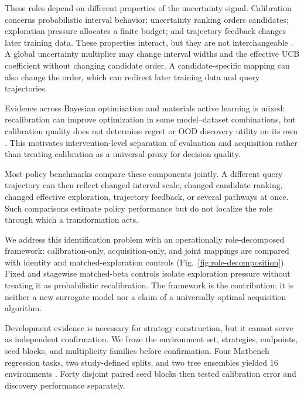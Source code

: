\documentclass[10pt]{article}
\begin{document}
These roles depend on different properties of the uncertainty signal.
Calibration concerns probabilistic interval behavior; uncertainty ranking
orders candidates; exploration pressure allocates a finite budget; and
trajectory feedback changes later training data. These properties interact,
but they are not interchangeable
\citep{gneiting2007proper,kuleshov2018calibrated,guo2017calibration,angelopoulos2023conformal,mandi2022decision,wilder2019decision,donti2017task}.
A global uncertainty multiplier may change interval widths and the effective
UCB coefficient without changing candidate order. A candidate-specific
mapping can also change the order, which can redirect later training data and
query trajectories.


Evidence across Bayesian optimization and materials active learning is mixed:
recalibration can improve optimization in some model--dataset combinations,
but calibration quality does not determine regret or OOD discovery utility on
its own \citep{foldager2023uncertainty,jiang2026calibration,dale2025ood}.
This motivates intervention-level separation of evaluation and acquisition
rather than treating calibration as a universal proxy for decision quality.

Most policy benchmarks compare these components jointly. A different query
trajectory can then reflect changed interval scale, changed candidate ranking,
changed effective exploration, trajectory feedback, or several pathways at
once. Such comparisons estimate policy performance but do not localize the
role through which a transformation acts.

We address this identification problem with an operationally role-decomposed
framework: calibration-only, acquisition-only, and joint mappings are compared
with identity and matched-exploration controls
(Fig.~\ref{fig:role-decomposition}). Fixed and stagewise matched-beta controls
isolate exploration pressure without treating it as probabilistic
recalibration. The framework is the contribution; it is neither a new
surrogate model nor a claim of a universally optimal acquisition algorithm.

Development evidence is necessary for strategy construction, but it cannot
serve as independent confirmation. We froze the environment set, strategies,
endpoints, seed blocks, and multiplicity families before confirmation. Four
Matbench regression tasks, two study-defined splits, and two tree ensembles
yielded 16 environments
\citep{dunn2020matbench,ward2018matminer,butler2018mlmaterials}.
Forty disjoint paired seed blocks then tested calibration error and discovery
performance separately.
\end{document}
